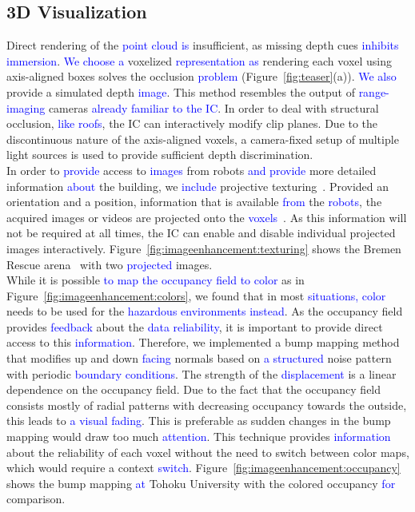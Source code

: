\documentclass{egpubl}
\newcommand{\diff}[1]{\textcolor{blue}{#1}}
\begin{document}
\subsection{3D Visualization} \label{sec:overview:3dvisualization}
 Direct rendering of the \diff{point cloud is} insufficient, as missing depth cues  \diff{inhibits immersion}. \diff{We choose a} voxelized \diff{representation as} rendering each voxel using axis-aligned boxes solves the occlusion \diff{problem} (Figure~\ref{fig:teaser}(a)). \diff{We also} provide a simulated depth \diff{image}. This method resembles the output of \diff{range-imaging} cameras \diff{already familiar to the IC}. In order to deal with structural occlusion, \diff{like roofs}, the IC can interactively modify clip planes. Due to the discontinuous nature of the axis-aligned voxels, a camera-fixed setup of multiple light sources is used to provide sufficient depth discrimination.\\
%
 In order to \diff{provide} access to \diff{images} from robots \diff{and provide} more detailed information \diff{about} the building, we \diff{include} projective texturing~\cite{everitt2001projective}. Provided an orientation and a position, information that is available \diff{from} the \diff{robots}, the acquired images or videos are projected onto the \diff{voxels}~\cite{1453517}. As this information will not be required at all times, the IC can enable and disable individual projected images interactively. Figure~\ref{fig:imageenhancement:texturing} shows the Bremen Rescue arena~\cite{varsadan08} with two \diff{projected} images.\\
%
  While it is possible \diff{to map the occupancy field to color} as in Figure~\ref{fig:imageenhancement:colors}, we found that in most \diff{situations,} \diff{color} needs to be used for the \diff{hazardous environments} \diff{instead}. As the occupancy field provides \diff{feedback} about the \diff{data reliability}, it is important to provide direct access to this \diff{information}. Therefore, we implemented a bump mapping method that modifies up and down \diff{facing} normals based on \diff{a structured} noise pattern with periodic \diff{boundary} \diff{conditions}. The strength of the \diff{displacement} is a linear dependence on the occupancy field. Due to the fact that the occupancy field consists mostly of radial patterns with decreasing occupancy towards the outside, this leads to \diff{a visual fading}. This is preferable as sudden changes in the bump mapping would draw too much \diff{attention}. This technique provides \diff{information} about the reliability of each voxel without the need to switch between color maps, which would require a context \diff{switch}. Figure~\ref{fig:imageenhancement:occupancy} shows the bump mapping \diff{at} Tohoku University with the colored occupancy \diff{for} comparison.\\
\end{document}
